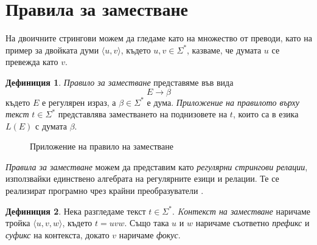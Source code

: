 \documentclass[12pt, oneside]{article}
\theoremstyle{definition}
\newtheorem{definition}{Дефиниция}[section]
\begin{document}
\pagebreak
\section{Правила за заместване}

На двоичните стрингови можем да гледаме като на множество от преводи, като на пример за двойката думи \( \langle u, v \rangle \), където \(u,v \in \Sigma^*\), казваме, че думата \( u \) се превежда като \( v \).

\begin{definition}
	\emph{Правило за заместване} представяме във вида
	\[ E \to \beta \]
	където \( E \) е регулярен израз, а \( \beta \in \Sigma^* \) е дума.
	\emph{Приложение на правилото върху текст} \( t \in \Sigma^* \) представлява заместването на поднизовете на \( t \), които са в езика \( L(E) \) с думата \( \beta \).
\end{definition}

\begin{figure}[!htb]
	\centering
	\caption{Приложение на правило на заместване}
\end{figure}

\noindent \emph{Правила за заместване} можем да представим като \emph{регулярни стрингови релации}, използвайки единствено алгебрата на регулярните езици и релации. Те се реализират програмно чрез крайни преобразуватели \cite{Kaplan&Kay:94}.

\begin{definition}
	Нека разгледаме текст \( t \in \Sigma^* \). \emph{Kонтекст на заместване} наричаме тройка \( \langle u,v,w \rangle \), където \( t = uvw \). Също така \( u \) и \( w \) наричаме съответно \emph{префикс} и \emph{суфикс} на контекста, докато \( v \) наричаме \emph{фокус}.
\end{definition}
\end{document}
